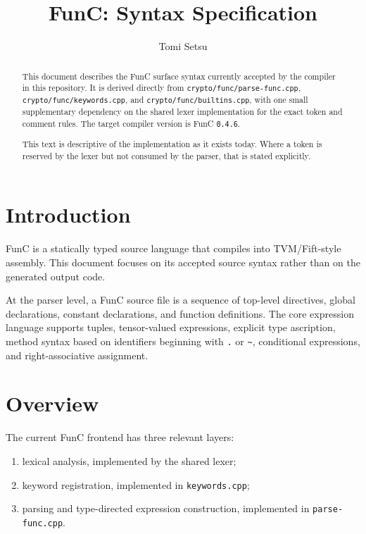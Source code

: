 \documentclass[12pt,oneside]{article}
\title{FunC: Syntax Specification}
\author{Tomi Setsu}
\begin{document}
\maketitle

\begin{abstract}
This document describes the FunC surface syntax currently accepted by the
compiler in this repository. It is derived directly from
\verb|crypto/func/parse-func.cpp|, \verb|crypto/func/keywords.cpp|, and
\verb|crypto/func/builtins.cpp|, with one small supplementary dependency on the
shared lexer implementation for the exact token and comment rules. The target
compiler version is FunC \verb|0.4.6|.

This text is descriptive of the implementation as it exists today. Where a
token is reserved by the lexer but not consumed by the parser, that is stated
explicitly.
\end{abstract}

\section*{Introduction}
FunC is a statically typed source language that compiles into TVM/Fift-style
assembly. This document focuses on its accepted source syntax rather than on the
generated output code.

At the parser level, a FunC source file is a sequence of top-level directives,
global declarations, constant declarations, and function definitions. The core
expression language supports tuples, tensor-valued expressions, explicit type
ascription, method syntax based on identifiers beginning with \verb|.| or
\verb|~|, conditional expressions, and right-associative assignment.

\clearpage
\tableofcontents

\clearpage
\section{Overview}
The current FunC frontend has three relevant layers:

\begin{enumerate}
\item lexical analysis, implemented by the shared lexer;
\item keyword registration, implemented in \verb|keywords.cpp|;
\item parsing and type-directed expression construction, implemented in
\verb|parse-func.cpp|.
\end{enumerate}
\end{document}
